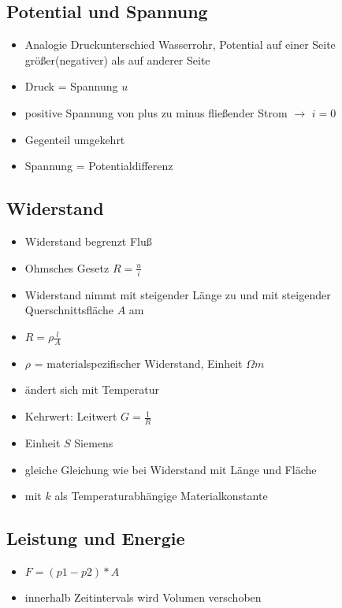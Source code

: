 \documentclass[a4paper,12pt]{article}
\begin{document}
\subsection*{Potential und Spannung}

\begin{itemize}
    \item Analogie Druckunterschied Wasserrohr, Potential auf einer Seite größer(negativer) als auf anderer Seite
    \item Druck = Spannung $u$
    \item positive Spannung von plus zu minus fließender Strom $\rightarrow$ $i = 0$
    \item Gegenteil umgekehrt
    \item Spannung = Potentialdifferenz
\end{itemize}

\subsection*{Widerstand}

\begin{itemize}
    \item Widerstand begrenzt Fluß 
    \item Ohmsches Gesetz $R = \frac{u}{i}$
    \item Widerstand nimmt mit steigender Länge zu und mit steigender Querschnittsfläche $A$ am
    \item $R = \rho \frac{l}{A}$
    \item $\rho$ = materialspezifischer Widerstand, Einheit $\Omega m$
    \item ändert sich mit Temperatur
    \item Kehrwert: Leitwert $G = \frac{1}{R}$
    \item Einheit $S$ Siemens
    \item gleiche Gleichung wie bei Widerstand mit Länge und Fläche
    \item mit $k$ als Temperaturabhängige Materialkonstante
\end{itemize}

\subsection*{Leistung und Energie}

\begin{itemize}
    \item $F = (p1 - p2) * A$
    \item innerhalb Zeitintervals wird Volumen verschoben
\end{itemize}
\end{document}
